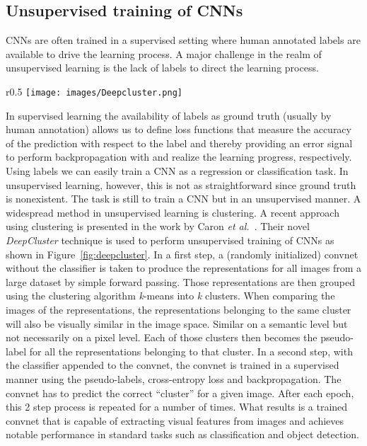 \documentclass[a4paper,12pt]{report}
\begin{document}
\subsection{Unsupervised training of CNNs}\label{subsec:deepcluster}
CNNs are often trained in a supervised setting where human annotated labels are available to drive the learning process. A major challenge in the realm of unsupervised learning is the lack of labels to direct the learning process. 
\begin{wrapfigure}{r}{0.5\textwidth}
\texttt{[image: images/Deepcluster.png]} 
\caption{DeepCluster unsupervised training of CNNs \cite{DeepCluster}.}
\label{fig:deepcluster}
\end{wrapfigure}
In supervised learning the availability of labels as ground truth (usually by human annotation) allows us to define loss functions that measure the accuracy of the prediction with respect to the label and thereby providing an error signal to perform backpropagation with and realize the learning progress, respectively. Using labels we can easily train a CNN as a regression or classification task. In unsupervised learning, however, this is not as straightforward since ground truth is nonexistent. The task is still to train a CNN but in an unsupervised manner. A widespread method in unsupervised learning is clustering. A recent approach using clustering is presented in the work by Caron \textit{et al.}~\cite{DeepCluster}. Their novel \textit{DeepCluster} technique is used to perform unsupervised training of CNNs as shown in Figure~\ref{fig:deepcluster}. In a first step, a (randomly initialized) convnet without the classifier is taken to produce the representations for all images from a large dataset by simple forward passing. Those representations are then grouped using the clustering algorithm \textit{k}-means into \textit{k} clusters. When comparing the images of the representations, the representations belonging to the same cluster will also be visually similar in the image space. Similar on a semantic level but not necessarily on a pixel level. Each of those clusters then becomes the pseudo-label for all the representations belonging to that cluster. In a second step, with the classifier appended to the convnet, the convnet is trained in a supervised manner using the pseudo-labels, cross-entropy loss and backpropagation. The convnet has to predict the correct ``cluster'' for a given image. After each epoch, this 2 step process is repeated for a number of times. What results is a trained convnet that is capable of extracting visual features from images and achieves notable performance in standard tasks such as classification and object detection.
\end{document}

